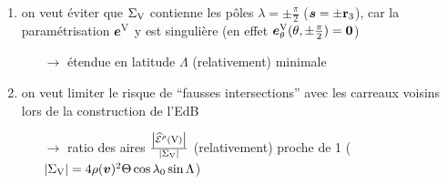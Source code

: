 \begin{enumerate}
    \item on veut éviter que $\Sigma_{\mathrm{V}}$ contienne les pôles $\lambda = \pm \frac{\pi}{2}$ (\ie $\bm{s} = \pm \mathbf{r}_3$), car la paramétrisation $\bm{e}^{\mathrm{V}}$ y est singulière (en effet $\bm{e}^{\mathrm{V}}_{\theta}(\theta, \pm \frac{\pi}{2}) = \bm{0}$)
    \begin{enumerate}
        \item[$\to$] étendue en latitude $\Lambda$ (relativement) minimale
    \end{enumerate}
    \item on veut limiter le risque de ``fausses intersections'' avec les carreaux voisins lors de la construction de l'EdB
    \begin{enumerate}
        \item[$\to$] ratio des aires $\frac{\left| \pseudoEdS{\brepvertex}{\rho} \right|}{\left| \Sigma_{\brepvertex} \right|}$ (relativement) proche de 1 ($\left| \Sigma_{\mathrm{V}} \right| = 4 \rho(\bm{v})^2 \Theta \cos \lambda_0 \sin \Lambda$)
    \end{enumerate}
    
\end{enumerate}












